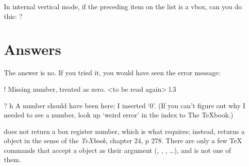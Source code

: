 
In internal vertical mode, if the preceding item on the list is a
vbox, can you do this: \cmd{\unvbox}\cmd{\lastbox}?

\begin{comment}
An answer will be posted circa July 6, 1993.

Michael Downes      mjd@math.ams.org (Internet)
\end{comment}


\section{Answers}

\begin{comment}
Date: 07 Jul 1993 12:45:34 -0400 (EDT)
From: Michael Downes <MJD@MATH.AMS.ORG>
Subject: Around the Bend #9, answer
Sender: ITeX-Mgr@SHSU.edu
To: info-tex@shsu.edu
Reply-to: Michael Downes <MJD@MATH.AMS.ORG>
Message-id: <742063535.36965.MJD@math.ams.org>
X-ListName: TeX-Related Network Discussion List <INFO-TeX@SHSU.edu>

"In internal vertical mode, if the preceding item on the list is a
"vbox, can you do this: \unvbox\lastbox?
\end{comment}


The answer is no. If you tried it, you would have seen the error
message:
\begin{lcode}
  ! Missing number, treated as zero.
  <to be read again> 
                     \lastbox 
  l.3   \unvbox\lastbox

  ? h
  A number should have been here; I inserted `0'.
  (If you can't figure out why I needed to see a number,
  look up `weird error' in the index to The TeXbook.)
\end{lcode}

\cmd{\lastbox} does not return a box register number, which is what \cmd{\unvbox}
requires; instead, \cmd{\lastbox} returns a  object in the sense of the
\emph{TeXbook}, chapter 24, p 278. There are only a few TeX commands that
accept a  object as their argument (\cmd{\shipout}, \cmd{\setbox}, 
\cmd{\leaders}, \ldots), and \cmd{\unvbox} is not one of them.

